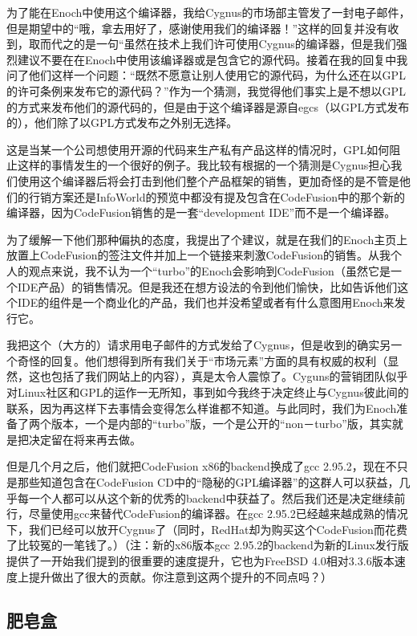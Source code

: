 为了能在Enoch中使用这个编译器，我给Cygnus的市场部主管发了一封电子邮件，但是期望中的“哦，拿去用好了，感谢使用我们的编译器！”这样的回复并没有收到，取而代之的是一句“虽然在技术上我们许可使用Cygnus的编译器，但是我们强烈建议不要在在Enoch中使用该编译器或是包含它的源代码。接着在我的回复中我问了他们这样一个问题：“既然不愿意让别人使用它的源代码，为什么还在以GPL的许可条例来发布它的源代码？”作为一个猜测，我觉得他们事实上是不想以GPL的方式来发布他们的源代码的，但是由于这个编译器是源自egcs（以GPL方式发布的），他们除了以GPL方式发布之外别无选择。

这是当某一个公司想使用开源的代码来生产私有产品这样的情况时，GPL如何阻止这样的事情发生的一个很好的例子。我比较有根据的一个猜测是Cygnus担心我们使用这个编译器后将会打击到他们整个产品框架的销售，更加奇怪的是不管是他们的行销方案还是InfoWorld的预览中都没有提及包含在CodeFusion中的那个新的编译器，因为CodeFusion销售的是一套“development IDE”而不是一个编译器。

为了缓解一下他们那种偏执的态度，我提出了个建议，就是在我们的Enoch主页上放置上CodeFusion的签注文件并加上一个链接来刺激CodeFusion的销售。从我个人的观点来说，我不认为一个“turbo”的Enoch会影响到CodeFusion（虽然它是一个IDE产品）的销售情况。但是我还在想方设法的令到他们愉快，比如告诉他们这个IDE的组件是一个商业化的产品，我们也并没希望或者有什么意图用Enoch来发行它。

我把这个（大方的）请求用电子邮件的方式发给了Cygnus，但是收到的确实另一个奇怪的回复。他们想得到所有我们关于“市场元素”方面的具有权威的权利（显然，这也包括了我们网站上的内容），真是太令人震惊了。Cyguns的营销团队似乎对Linux社区和GPL的运作一无所知，事到如今我终于决定终止与Cygnus彼此间的联系，因为再这样下去事情会变得怎么样谁都不知道。与此同时，我们为Enoch准备了两个版本，一个是内部的“turbo”版，一个是公开的“non－turbo”版，其实就是把决定留在将来再去做。

但是几个月之后，他们就把CodeFusion x86的backend换成了gcc 2.95.2，现在不只是那些知道包含在CodeFusion CD中的“隐秘的GPL编译器”的这群人可以获益，几乎每一个人都可以从这个新的优秀的backend中获益了。然后我们还是决定继续前行，尽量使用gcc来替代CodeFusion的编译器。在gcc 2.95.2已经越来越成熟的情况下，我们已经可以放开Cygnus了（同时，RedHat却为购买这个CodeFusion而花费了比较冤的一笔钱了。）（注：新的x86版本gcc 2.95.2的backend为新的Linux发行版提供了一开始我们提到的很重要的速度提升，它也为FreeBSD 4.0相对3.3.6版本速度上提升做出了很大的贡献。你注意到这两个提升的不同点吗？）

\subsection{肥皂盒}

